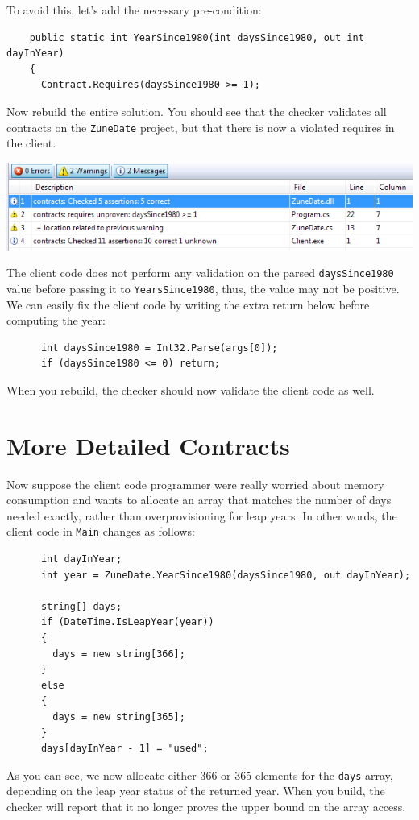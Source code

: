 \documentclass{article}
\newcommand{\code}[1]{\lstinline{#1}}
\begin{document}
To avoid this, let's add the necessary pre-condition:
\begin{lstlisting}
    public static int YearSince1980(int daysSince1980, out int dayInYear)
    {
      Contract.Requires(daysSince1980 >= 1);
\end{lstlisting}
Now rebuild the entire solution. You should see that the checker
validates all contracts on the \code{ZuneDate} project, but that there
is now a violated requires in the client.
\begin{center}
  \includegraphics[width=1\columnwidth]{errors7.png}
\end{center}
The client code does not perform any validation on the parsed
\code{daysSince1980} value before passing it to \code{YearsSince1980},
thus, the value may not be positive.  We can easily fix the client
code by writing the extra return below before computing the year:
\begin{lstlisting}
      int daysSince1980 = Int32.Parse(args[0]);
      if (daysSince1980 <= 0) return;
\end{lstlisting}
When you rebuild, the checker should now validate the client code as
well.

\section{More Detailed Contracts}
Now suppose the client code programmer were really worried about
memory consumption and wants to allocate an array that matches the
number of days needed exactly, rather than overprovisioning for leap
years. In other words, the client code in \code{Main} changes as follows:
\begin{lstlisting}
      int dayInYear;
      int year = ZuneDate.YearSince1980(daysSince1980, out dayInYear);

      string[] days;
      if (DateTime.IsLeapYear(year))
      {
        days = new string[366];
      }
      else
      {
        days = new string[365];
      }
      days[dayInYear - 1] = "used";
\end{lstlisting}
As you can see, we now allocate either 366 or 365 elements for the
\code{days} array, depending on the leap year status of the returned
year. When you build, the checker will report that it no longer proves
the upper bound on the array access. 
\end{document}
